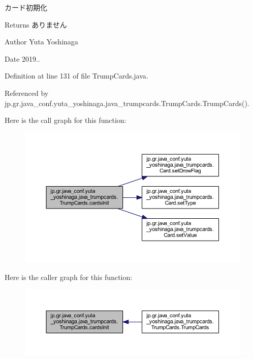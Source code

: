 カード初期化 

\begin{DoxyReturn}{Returns}
ありません 
\end{DoxyReturn}
\begin{DoxyAuthor}{Author}
Yuta Yoshinaga 
\end{DoxyAuthor}
\begin{DoxyDate}{Date}
2019.. 
\end{DoxyDate}


Definition at line 131 of file Trump\+Cards.\+java.



Referenced by jp.\+gr.\+java\+\_\+conf.\+yuta\+\_\+yoshinaga.\+java\+\_\+trumpcards.\+Trump\+Cards.\+Trump\+Cards().

Here is the call graph for this function\+:
\nopagebreak
\begin{figure}[H]
\begin{center}
\leavevmode
\includegraphics[width=350pt]{classjp_1_1gr_1_1java__conf_1_1yuta__yoshinaga_1_1java__trumpcards_1_1_trump_cards_a8e8a4cda3a952cb6a295274765240808_cgraph}
\end{center}
\end{figure}
Here is the caller graph for this function\+:
\nopagebreak
\begin{figure}[H]
\begin{center}
\leavevmode
\includegraphics[width=350pt]{classjp_1_1gr_1_1java__conf_1_1yuta__yoshinaga_1_1java__trumpcards_1_1_trump_cards_a8e8a4cda3a952cb6a295274765240808_icgraph}
\end{center}
\end{figure}

